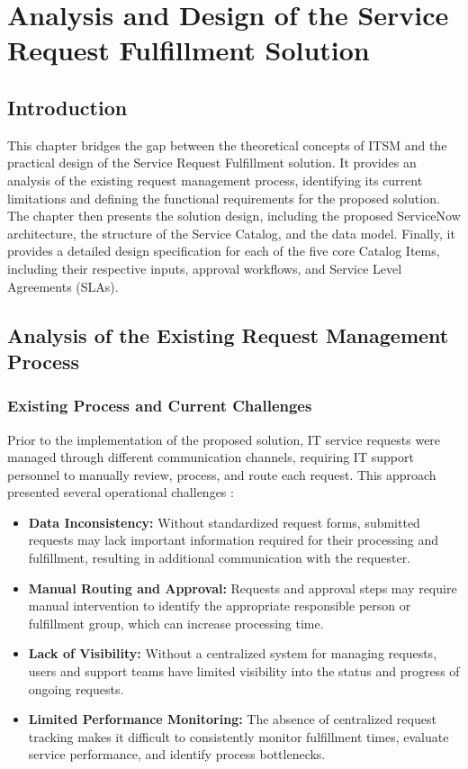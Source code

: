 \documentclass[12pt,a4paper]{report}
\begin{document}
\chapter{Analysis and Design of the Service Request Fulfillment Solution}

\section{Introduction}
This chapter bridges the gap between the theoretical concepts of ITSM and the
practical design of the Service Request Fulfillment solution. It provides an
analysis of the existing request management process, identifying its current
limitations and defining the functional requirements for the proposed
solution. The chapter then presents the solution design, including the
proposed ServiceNow architecture, the structure of the Service Catalog, and
the data model. Finally, it provides a detailed design specification for each
of the five core Catalog Items, including their respective inputs, approval
workflows, and Service Level Agreements (SLAs).

\section{Analysis of the Existing Request Management Process}
\subsection{Existing Process and Current Challenges}
Prior to the implementation of the proposed solution, IT service requests were managed through 
different communication channels, requiring IT support personnel to manually review, process, and route each request. 
This approach presented several operational challenges : 

\begin{itemize}
    \item \textbf{Data Inconsistency:} Without standardized request forms,
    submitted requests may lack important information required for their
    processing and fulfillment, resulting in additional communication with
    the requester.

    \item \textbf{Manual Routing and Approval:} Requests and approval steps
    may require manual intervention to identify the appropriate responsible
    person or fulfillment group, which can increase processing time.

    \item \textbf{Lack of Visibility:} Without a centralized system for
    managing requests, users and support teams have limited visibility into
    the status and progress of ongoing requests.

    \item \textbf{Limited Performance Monitoring:} The absence of centralized
    request tracking makes it difficult to consistently monitor fulfillment
    times, evaluate service performance, and identify process bottlenecks.
\end{itemize}
\end{document}
